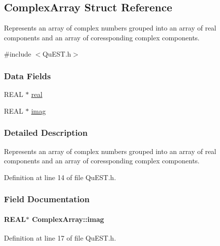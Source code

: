 \hypertarget{structComplexArray}{
\subsection{ComplexArray Struct Reference}
\label{structComplexArray}
}


Represents an array of complex numbers grouped into an array of real components and an array of coressponding complex components.  


{\ttfamily \#include $<$QuEST.h$>$}\subsubsection*{Data Fields}
\begin{DoxyCompactItemize}
\item 
REAL $\ast$ \hyperlink{structComplexArray_a4195cac6c784ea1b6271f1c7dba1548a}{real}
\item 
REAL $\ast$ \hyperlink{structComplexArray_a79dde47c7ae530c79cebfdf57b225968}{imag}
\end{DoxyCompactItemize}


\subsubsection{Detailed Description}
Represents an array of complex numbers grouped into an array of real components and an array of coressponding complex components. 

Definition at line 14 of file QuEST.h.

\subsubsection{Field Documentation}
\hypertarget{structComplexArray_a79dde47c7ae530c79cebfdf57b225968}{
\paragraph[{imag}]{\setlength{\rightskip}{0pt plus 5cm}REAL$\ast$ {\bf ComplexArray::imag}}\hfill}
\label{structComplexArray_a79dde47c7ae530c79cebfdf57b225968}


Definition at line 17 of file QuEST.h.

